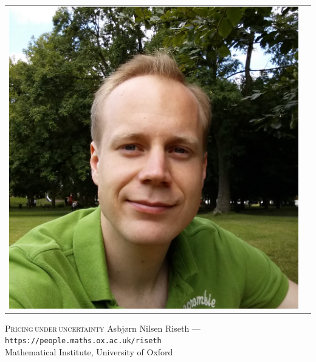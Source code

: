 \documentclass[a0paper,portrait,fontscale=0.35]{baposter}
\begin{document}
\begin{poster}
{{\begin{tabular}{cc}
          \includegraphics[height=0.05\textheight]{./img/profile}
      \end{tabular}
      \hfill
    }
  }
  {\textsc{Pricing\,under\,uncertainty}}
  {
    \vspace{0.5em}
    Asbj{\o}rn Nilsen Riseth ---
    \texttt{https://people.maths.ox.ac.uk/riseth}\\[0.1em]
    { Mathematical Institute, University of Oxford}
  }
  {
  }


\end{poster}
\end{document}
